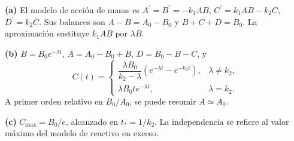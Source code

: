 \noindent\textbf{(a)} El modelo de acción de masas es $A^{\prime}=B^{\prime}=-k_1AB$, $C^{\prime}=k_1AB-k_2C$, $D^{\prime}=k_2C$. Sus balances son $A-B=A_0-B_0$ y $B+C+D=B_0$. La aproximación sustituye $k_1AB$ por $\lambda B$.

\noindent\textbf{(b)} $B=B_0e^{-\lambda t}$, $A=A_0-B_0+B$, $D=B_0-B-C$, y\[C(t)=\begin{cases}\dfrac{\lambda B_0}{k_2-\lambda}(e^{-\lambda t}-e^{-k_2t}),&\lambda\ne k_2,\\ \lambda B_0t e^{-\lambda t},&\lambda=k_2.\end{cases}\]A primer orden relativo en $B_0/A_0$, se puede resumir $A\simeq A_0$.

\noindent\textbf{(c)} $C_{\max}=B_0/e$, alcanzado en $t_*=1/k_2$. La independencia se refiere al valor máximo del modelo de reactivo en exceso.
